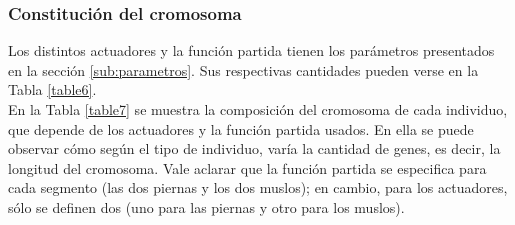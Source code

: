 \documentclass{article}
\begin{document}
\begin{table}[H]%
  \centering
  \captionsetup{justification=centering}
  \caption{Tipo de individuos }%
  \label{table5}%
\end{table}

\subsubsection{Constituci\'on del cromosoma}
Los distintos actuadores y la funci\'on partida tienen los par\'ametros presentados en la secci\'on \ref{sub:parametros}. Sus respectivas cantidades pueden verse en la Tabla \ref{table6}.\\
En la Tabla \ref{table7} se muestra la composici\'on del cromosoma de cada individuo, que depende de los actuadores y la funci\'on partida usados. En ella se puede observar c\'omo seg\'un el tipo de individuo, var\'ia la cantidad de genes, es decir, la longitud del cromosoma. Vale aclarar que la funci\'on partida se especifica para cada segmento (las dos piernas y los dos muslos); en cambio, para los actuadores, s\'olo se definen dos (uno para las piernas y otro para los muslos). \\
\end{document}
